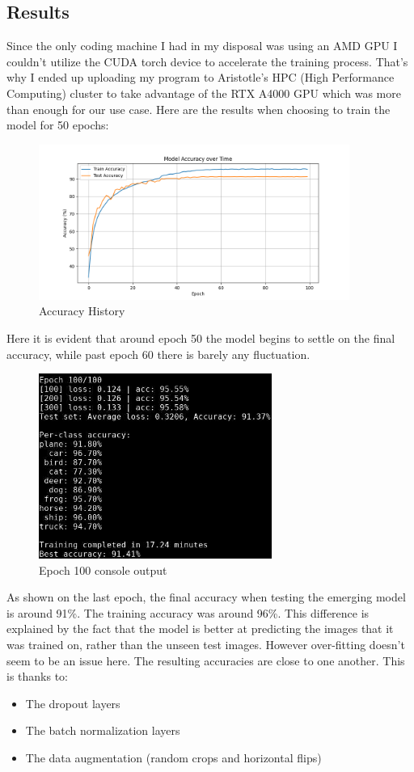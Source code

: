 \subsection{Results}
Since the only coding machine I had in my disposal was using an AMD GPU I couldn't utilize the
CUDA torch device to accelerate the training process. That's why I ended up uploading my program
to Aristotle's HPC (High Performance Computing) cluster to take advantage of the RTX A4000 GPU 
which was more than enough for our use case. Here are the results when choosing to train the model
for 50 epochs:
\begin{figure}[H]
    \centering
    \includegraphics[width=4in]{media/cifar10_accuracy.png}
    \caption{Accuracy History}
    \label{CIFAR example}
\end{figure}
Here it is evident that around epoch 50 the model begins to settle on the final accuracy, while past
epoch 60 there is barely any fluctuation.
\begin{figure}[H]
    \centering
    \includegraphics[width=3in]{media/epoch_100.png}
    \caption{Epoch 100 console output}
    \label{CIFAR example}
\end{figure}
As shown on the last epoch, the final accuracy when testing the emerging model is around 91\%. The 
training accuracy was around 96\%. This difference is explained by the fact that the model is better
at predicting the images that it was trained on, rather than the unseen test images. However over-fitting
doesn't seem to be an issue here. The resulting accuracies are close to one another. This is thanks to:
\begin{itemize}
    \item The dropout layers
    \item The batch normalization layers
    \item The data augmentation (random crops and horizontal flips) 
\end{itemize}

